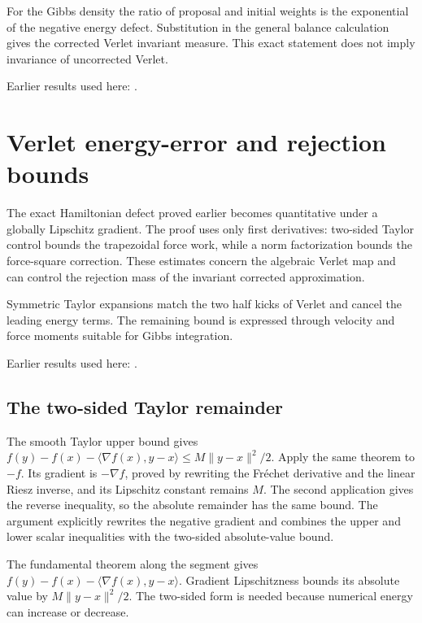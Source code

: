 \documentclass[11pt,a4paper]{report}
\begin{document}
For the Gibbs density the ratio of proposal and initial weights is the exponential of the negative energy defect. Substitution in the general balance calculation gives the corrected Verlet invariant measure. This exact statement does not imply invariance of uncorrected Verlet.



Earlier results used here: \cite[Section~3.35.3]{LangevinLean2026ULASC}.
\section{\texorpdfstring{Verlet energy-error and rejection bounds}{Verlet energy-error and rejection bounds}}
\label{proof-module-KineticLangevin-HamiltonianError-lean}


The exact Hamiltonian defect proved earlier becomes quantitative under a globally Lipschitz gradient. The proof uses only first derivatives: two-sided Taylor control bounds the trapezoidal force work, while a norm factorization bounds the force-square correction. These estimates concern the algebraic Verlet map and can control the rejection mass of the invariant corrected approximation.



Symmetric Taylor expansions match the two half kicks of Verlet and cancel the leading energy terms. The remaining bound is expressed through velocity and force moments suitable for Gibbs integration.



Earlier results used here: \cite[Section~3.9]{LangevinLean2026ULASC}.
\subsection{\texorpdfstring{The two-sided Taylor remainder}{The two-sided Taylor remainder}}
\label{report-step-KineticLangevin-HamiltonianError-lean-1}


The smooth Taylor upper bound gives \(f(y)-f(x)-\langle\nabla f(x),y-x\rangle\le M\|y-x\|^2/2\). Apply the same theorem to \(-f\). Its gradient is \(-\nabla f\), proved by rewriting the Fréchet derivative and the linear Riesz inverse, and its Lipschitz constant remains \(M\). The second application gives the reverse inequality, so the absolute remainder has the same bound. The argument explicitly rewrites the negative gradient and combines the upper and lower scalar inequalities with the two-sided absolute-value bound.



The fundamental theorem along the segment gives \(f(y)-f(x)-\langle\nabla f(x),y-x\rangle\). Gradient Lipschitzness bounds its absolute value by \(M\|y-x\|^2/2\). The two-sided form is needed because numerical energy can increase or decrease.
\end{document}
